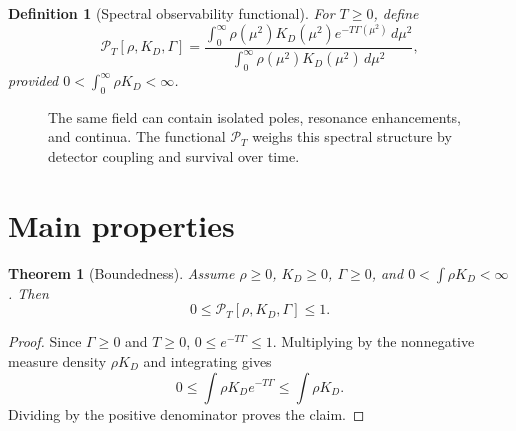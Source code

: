 \documentclass[11pt]{article}
\newtheorem{theorem}{Theorem}
\newtheorem{definition}{Definition}
\theoremstyle{remark}
\begin{document}
\begin{definition}[Spectral observability functional]
For $T\ge0$, define
\begin{equation}
\mathcal P_T[\rho,K_D,\Gamma]
= \frac{\int_0^\infty \rho(\mu^2)K_D(\mu^2)e^{-T\Gamma(\mu^2)}\,d\mu^2}
{\int_0^\infty \rho(\mu^2)K_D(\mu^2)\,d\mu^2},
\end{equation}
provided $0<\int_0^\infty\rho K_D<\infty$.
\end{definition}

\begin{figure}[h]
\centering
{}
\caption{The same field can contain isolated poles, resonance enhancements, and continua. The functional $\mathcal P_T$ weighs this spectral structure by detector coupling and survival over time.}
\end{figure}

\section{Main properties}

\begin{theorem}[Boundedness]
Assume $\rho\ge0$, $K_D\ge0$, $\Gamma\ge0$, and $0<\int\rho K_D<\infty$. Then
\begin{equation}
0\le \mathcal P_T[\rho,K_D,\Gamma]\le1 .
\end{equation}
\end{theorem}

\begin{proof}
Since $\Gamma\ge0$ and $T\ge0$, $0\le e^{-T\Gamma}\le1$. Multiplying by the nonnegative measure density $\rho K_D$ and integrating gives
\begin{equation}
0\le\int\rho K_D e^{-T\Gamma}\le\int\rho K_D.
\end{equation}
Dividing by the positive denominator proves the claim.
\end{proof}
\end{document}
